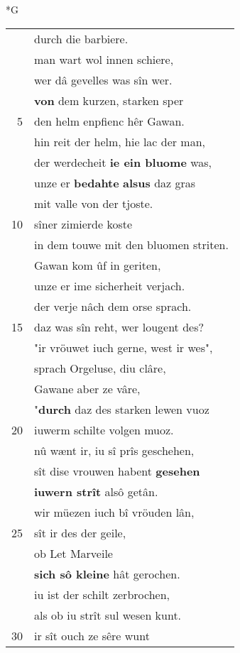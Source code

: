 \documentclass[8pt,a4paper,notitlepage]{article}
\begin{document}
\begin{table}[ht]
\begin{minipage}[t]{0.5\linewidth}
\small
\begin{center}*G
\end{center}
\begin{tabular}{rl}
 & durch die barbiere.\\ 
 & man wart wol innen schiere,\\ 
 & wer dâ gevelles was sîn wer.\\ 
 & \textbf{von} dem kurzen, starken sper\\ 
5 & den helm enpfienc hêr Gawan.\\ 
 & hin reit der helm, hie lac der man,\\ 
 & der werdecheit \textbf{ie ein bluome} was,\\ 
 & unze er \textbf{bedahte} \textbf{alsus} daz gras\\ 
 & mit valle von der tjoste.\\ 
10 & sîner zimierde koste\\ 
 & in dem touwe mit den bluomen striten.\\ 
 & Gawan kom ûf in geriten,\\ 
 & unze er ime sicherheit verjach.\\ 
 & der verje nâch dem orse sprach.\\ 
15 & daz was sîn reht, wer lougent des?\\ 
 & "ir vröuwet iuch gerne, west ir wes",\\ 
 & sprach Orgeluse, diu clâre,\\ 
 & Gawane aber ze vâre,\\ 
 & "\textbf{durch} daz des starken lewen vuoz\\ 
20 & iuwerm schilte volgen muoz.\\ 
 & nû wænt ir, iu sî prîs geschehen,\\ 
 & sît dise vrouwen habent \textbf{gesehen}\\ 
 & \textbf{iuwern strît} alsô getân.\\ 
 & wir müezen iuch bî vröuden lân,\\ 
25 & sît ir des der geile,\\ 
 & ob Let Marveile\\ 
 & \textbf{sich sô kleine} hât gerochen.\\ 
 & iu ist der schilt zerbrochen,\\ 
 & als ob iu strît sul wesen kunt.\\ 
30 & ir sît ouch ze sêre wunt\\ 

\end{tabular}
\end{minipage}
\end{table}
\end{document}

